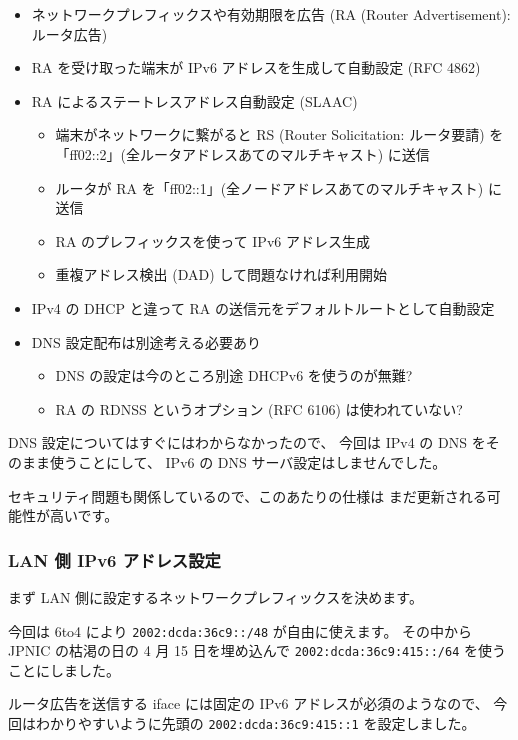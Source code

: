 \documentclass[mingoth,a4paper]{jsarticle}
\begin{document}
\begin{itemize}
\item ネットワークプレフィックスや有効期限を広告 (RA (Router Advertisement): ルータ広告)
\item RA を受け取った端末が IPv6 アドレスを生成して自動設定 (RFC 4862)
\item RA によるステートレスアドレス自動設定 (SLAAC)

\begin{itemize}
\item 端末がネットワークに繋がると RS (Router Solicitation: ルータ要請) を
    「ff02::2」(全ルータアドレスあてのマルチキャスト) に送信
\item ルータが RA を「ff02::1」(全ノードアドレスあてのマルチキャスト) に送信
\item RA のプレフィックスを使って IPv6 アドレス生成
\item 重複アドレス検出 (DAD) して問題なければ利用開始
\end{itemize}

\item IPv4 の DHCP と違って RA の送信元をデフォルトルートとして自動設定
\item DNS 設定配布は別途考える必要あり

\begin{itemize}
\item DNS の設定は今のところ別途 DHCPv6 を使うのが無難?
\item RA の RDNSS というオプション (RFC 6106) は使われていない?
\end{itemize}

\end{itemize}


DNS 設定についてはすぐにはわからなかったので、
今回は IPv4 の DNS をそのまま使うことにして、
IPv6 の DNS サーバ設定はしませんでした。

セキュリティ問題も関係しているので、このあたりの仕様は
まだ更新される可能性が高いです。
\subsubsection{LAN 側 IPv6 アドレス設定}

まず LAN 側に設定するネットワークプレフィックスを決めます。

今回は 6to4 により \texttt{2002:dcda:36c9::/48} が自由に使えます。
その中から JPNIC の枯渇の日の 4 月 15 日を埋め込んで
\texttt{2002:dcda:36c9:415::/64} を使うことにしました。

ルータ広告を送信する iface には固定の IPv6 アドレスが必須のようなので、
今回はわかりやすいように先頭の \texttt{2002:dcda:36c9:415::1} を設定しました。
\end{document}

